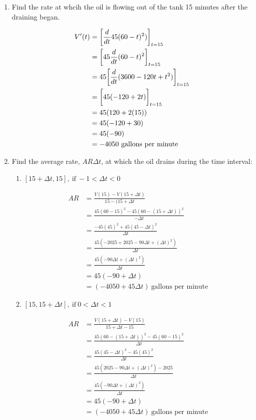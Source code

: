 \documentclass[nooutcomes,handout]{ximera}
\begin{document}
\begin{problem}
\begin{enumerate}
		\item Find the rate at whcih the oil is flowing out of the tank 15 minutes after the draining began.
			\begin{freeResponse}
			\begin{align*}
			V'(t)&= \bigg[ \frac{d }{d t} 45(60-t)^2) \bigg]_{t=15}\\
			&=\bigg[ 45 \frac{d }{d t} (60-t)^2 \bigg]_{t=15}\\
			&=45\bigg[ \frac{d }{d t}(3600-120t+t^2) \bigg]_{t=15}\\
			&=\bigg[ 45(-120+2t) \bigg]_{t=15}\\
			&=45(120+2(15))\\
			&=45(-120+30)\\
			&=45(-90)\\
			&=-4050\ \text{gallons per minute}
			\end{align*}
			\end{freeResponse}
		\item Find the average rate, $AR \Delta t$, at which the oil drains during the time interval:
			\begin{enumerate}
				\item $[15+ \Delta t,15],\ \text{if}\ -1< \Delta t<0$
			\begin{freeResponse}
					\begin{align*}
					AR&= \frac{V(15)-V(15+\Delta t)}{15-(15+\Delta t}\\
					&=\frac{45(60-15)^2-45(60-(15+\Delta t))^2}{-\Delta t}\\
					&=\frac{-45(45)^2+45(45-\Delta t)^2}{\Delta t}\\
					&=\frac{45(-2025+2025-90\Delta t+(\Delta t)^2)}{\Delta t}\\
					&=\frac{45(-90\Delta t+(\Delta t)^2)}{\Delta t}\\
					&=45(-90+\Delta t)\\
					&=(-4050+45\Delta t)\ \text{gallons per minute}			
					\end{align*}
			\end{freeResponse}			

				\item $[15,15+ \Delta t],\ \text{if}\ 0< \Delta t<1$
			\begin{freeResponse}
					\begin{align*}
					AR&= \frac{V(15+\Delta t)-V(15)}{15+\Delta t-15}\\
					&=\frac{45(60-(15+\Delta t))^2-45(60-15)^2}{\Delta t}\\
					&=\frac{45(45-\Delta t)^2-45(45)^2}{\Delta t}\\
					&=\frac{45(2025-90\Delta t+(\Delta t)^2)-2025}{\Delta t}\\
					&=\frac{45(-90\Delta t+(\Delta t)^2)}{\Delta t}\\
					&=45(-90+\Delta t)\\
					&=(-4050+45\Delta t)\ \text{gallons per minute}			
					\end{align*}
			\end{freeResponse}
			\end{enumerate}


\end{enumerate}
\end{problem}
\end{document}
